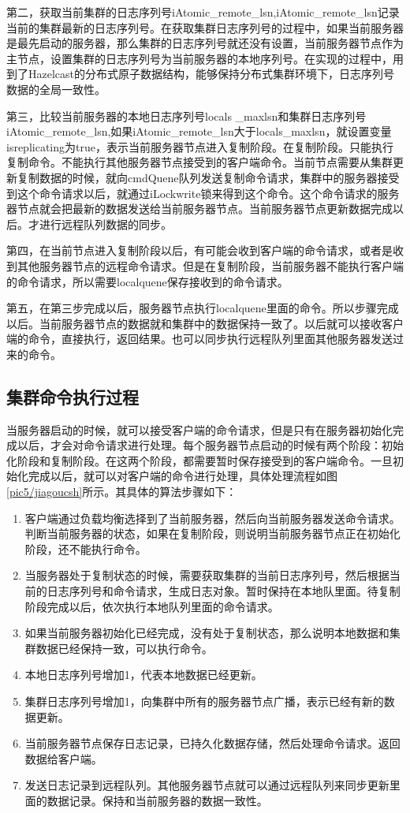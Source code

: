 第二，获取当前集群的日志序列号iAtomic\_remote\_lsn,iAtomic\_remote\_lsn记录当前的集群最新的日志序列号。在获取集群日志序列号的过程中，如果当前服务器是最先启动的服务器，那么集群的日志序列号就还没有设置，当前服务器节点作为主节点，设置集群的日志序列号为当前服务器的本地序列号。在实现的过程中，用到了Hazelcast的分布式原子数据结构，能够保持分布式集群环境下，日志序列号数据的全局一致性。

第三，比较当前服务器的本地日志序列号locals
\_maxlsn和集群日志序列号iAtomic\_remote\_lsn,如果iAtomic\_remote\_lsn大于locals\_maxlsn，就设置变量isreplicating为true，表示当前服务器节点进入复制阶段。在复制阶段。只能执行复制命令。不能执行其他服务器节点接受到的客户端命令。当前节点需要从集群更新复制数据的时候，就向cmdQuene队列发送复制命令请求，集群中的服务器接受到这个命令请求以后，就通过iLockwrite锁来得到这个命令。这个命令请求的服务器节点就会把最新的数据发送给当前服务器节点。当前服务器节点更新数据完成以后。才进行远程队列数据的同步。

第四，在当前节点进入复制阶段以后，有可能会收到客户端的命令请求，或者是收到其他服务器节点的远程命令请求。但是在复制阶段，当前服务器不能执行客户端的命令请求，所以需要localquene保存接收到的命令请求。

第五，在第三步完成以后，服务器节点执行localquene里面的命令。所以步骤完成以后。当前服务器节点的数据就和集群中的数据保持一致了。以后就可以接收客户端的命令，直接执行，返回结果。也可以同步执行远程队列里面其他服务器发送过来的命令。
\subsection{集群命令执行过程}
当服务器启动的时候，就可以接受客户端的命令请求，但是只有在服务器初始化完成以后，才会对命令请求进行处理。每个服务器节点启动的时候有两个阶段：初始化阶段和复制阶段。在这两个阶段，都需要暂时保存接受到的客户端命令。一旦初始化完成以后，就可以对客户端的命令进行处理，具体处理流程如图\ref{pic5/jiagoucsh}所示。其具体的算法步骤如下：

\begin{enumerate}[fullwidth,itemindent=2em]
	\item 客户端通过负载均衡选择到了当前服务器，然后向当前服务器发送命令请求。判断当前服务器的状态，如果在复制阶段，则说明当前服务器节点正在初始化阶段，还不能执行命令。
	\item 当服务器处于复制状态的时候，需要获取集群的当前日志序列号，然后根据当前的日志序列号和命令请求，生成日志对象。暂时保持在本地队里面。待复制阶段完成以后，依次执行本地队列里面的命令请求。
	\item 如果当前服务器初始化已经完成，没有处于复制状态，那么说明本地数据和集群数据已经保持一致，可以执行命令。
	\item 本地日志序列号增加1，代表本地数据已经更新。
	\item 集群日志序列号增加1，向集群中所有的服务器节点广播，表示已经有新的数据更新。
	\item 当前服务器节点保存日志记录，已持久化数据存储，然后处理命令请求。返回数据给客户端。
	\item 发送日志记录到远程队列。其他服务器节点就可以通过远程队列来同步更新里面的数据记录。保持和当前服务器的数据一致性。
\end{enumerate}
